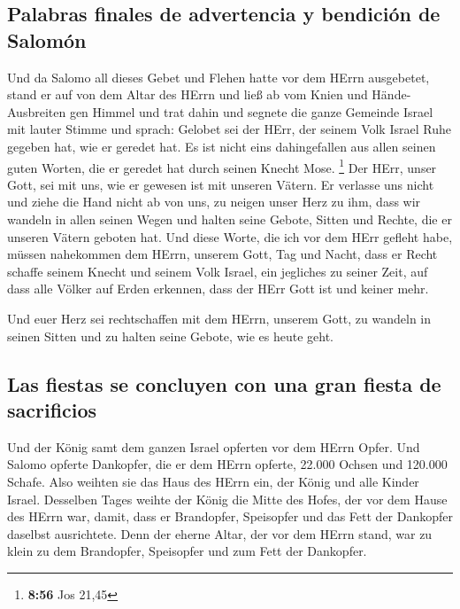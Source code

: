 \hypertarget{palabras-finales-de-advertencia-y-bendiciuxf3n-de-salomuxf3n}{%
\subsection{Palabras finales de advertencia y bendición de
Salomón}\label{palabras-finales-de-advertencia-y-bendiciuxf3n-de-salomuxf3n}}

 Und da Salomo all dieses Gebet und Flehen hatte vor dem
HErrn ausgebetet, stand er auf von dem Altar des HErrn und ließ ab vom
Knien und Hände-Ausbreiten gen Himmel  und trat dahin und
segnete die ganze Gemeinde Israel mit lauter Stimme und sprach:
 Gelobet sei der HErr, der seinem Volk Israel Ruhe
gegeben hat, wie er geredet hat. Es ist nicht eins dahingefallen aus
allen seinen guten Worten, die er geredet hat durch seinen Knecht Mose.
\footnote{\textbf{8:56} Jos 21,45}  Der HErr, unser Gott,
sei mit uns, wie er gewesen ist mit unseren Vätern. Er verlasse uns
nicht und ziehe die Hand nicht ab von uns,  zu neigen
unser Herz zu ihm, dass wir wandeln in allen seinen Wegen und halten
seine Gebote, Sitten und Rechte, die er unseren Vätern geboten hat.
 Und diese Worte, die ich vor dem HErr gefleht habe,
müssen nahekommen dem HErrn, unserem Gott, Tag und Nacht, dass er Recht
schaffe seinem Knecht und seinem Volk Israel, ein jegliches zu seiner
Zeit,  auf dass alle Völker auf Erden erkennen, dass der
HErr Gott ist und keiner mehr.

 Und euer Herz sei rechtschaffen mit dem HErrn, unserem
Gott, zu wandeln in seinen Sitten und zu halten seine Gebote, wie es
heute geht.

\hypertarget{las-fiestas-se-concluyen-con-una-gran-fiesta-de-sacrificios}{%
\subsection{Las fiestas se concluyen con una gran fiesta de
sacrificios}\label{las-fiestas-se-concluyen-con-una-gran-fiesta-de-sacrificios}}

 Und der König samt dem ganzen Israel opferten vor dem
HErrn Opfer.  Und Salomo opferte Dankopfer, die er dem
HErrn opferte, 22.000 Ochsen und 120.000 Schafe. Also weihten sie das
Haus des HErrn ein, der König und alle Kinder Israel. 
Desselben Tages weihte der König die Mitte des Hofes, der vor dem Hause
des HErrn war, damit, dass er Brandopfer, Speisopfer und das Fett der
Dankopfer daselbst ausrichtete. Denn der eherne Altar, der vor dem HErrn
stand, war zu klein zu dem Brandopfer, Speisopfer und zum Fett der
Dankopfer.

